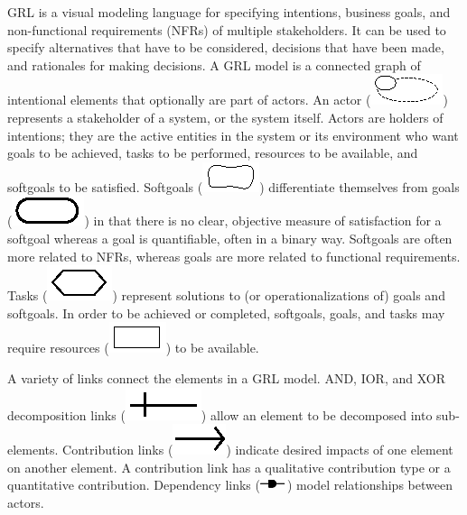 \documentclass[11.5pt,two column]{llncs}
\begin{document}
GRL is a visual modeling language for specifying intentions, business goals, and non-functional requirements (NFRs) of multiple stakeholders. It can be used to specify alternatives that have to be considered, decisions that have been made, and rationales for making decisions. A GRL model is a connected graph of intentional elements that optionally are part of actors. An actor (\includegraphics[scale=1]{img/actor}) represents a stakeholder of a system, or the system itself. Actors are holders of intentions; they are the active entities in the system or its environment who want goals to be achieved, tasks to be performed, resources to be available, and softgoals to be satisfied. Softgoals (\includegraphics[scale=1]{img/softgoal}) differentiate themselves from goals (\includegraphics[scale=1]{img/goal}) in that there is no clear, objective measure of satisfaction for a softgoal whereas a goal is quantifiable, often in a binary way. Softgoals are often more related to NFRs, whereas goals are more related to functional requirements. Tasks (\includegraphics[scale=1]{img/task}) represent solutions to (or operationalizations of) goals and softgoals. In order to be achieved or completed, softgoals, goals, and tasks may require resources (\includegraphics[scale=1]{img/resource}) to be available.

A variety of links connect the elements in a GRL model. AND, IOR, and XOR decomposition links (\includegraphics[scale=1]{img/decomposition}) allow an element to be decomposed into sub-elements. Contribution links (\includegraphics[scale=1]{img/contribution}) indicate desired impacts of one element on another element. A contribution link has a qualitative contribution type or a quantitative contribution. Dependency links (\includegraphics[scale=1]{img/dependency}) model relationships between actors.
\end{document}
